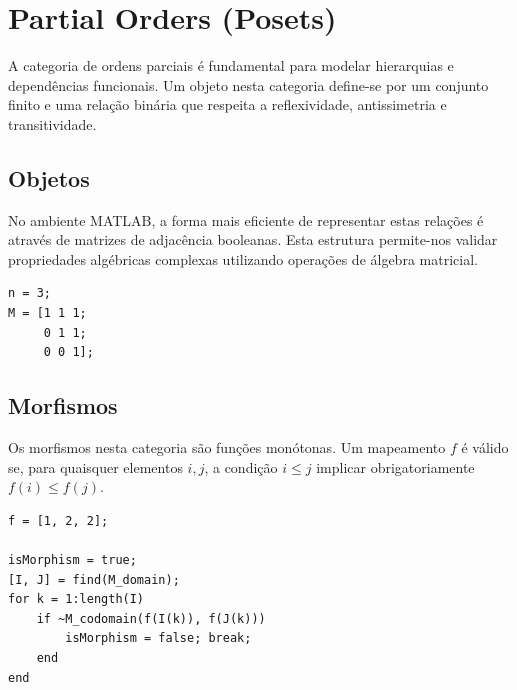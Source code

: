 \section{Partial Orders (Posets)}

A categoria de ordens parciais é fundamental para modelar hierarquias e dependências funcionais. Um objeto nesta categoria define-se por um conjunto finito e uma relação binária que respeita a reflexividade, antissimetria e transitividade.

\subsection{Objetos}
No ambiente MATLAB, a forma mais eficiente de representar estas relações é através de matrizes de adjacência booleanas. Esta estrutura permite-nos validar propriedades algébricas complexas utilizando operações de álgebra matricial.

\begin{lstlisting}[caption={Representação de um Poset (1 <= 2 <= 3)}]
% Matriz de adjacência para uma ordem linear
n = 3;
M = [1 1 1; 
     0 1 1; 
     0 0 1]; 
\end{lstlisting}

\subsection{Morfismos}
Os morfismos nesta categoria são funções monótonas. Um mapeamento $f$ é válido se, para quaisquer elementos $i, j$, a condição $i \le j$ implicar obrigatoriamente $f(i) \le f(j)$.

\begin{lstlisting}[caption={Algoritmo de Verificação de Monotonia}]
% f é um vetor onde o índice é o domínio e o valor é a imagem
f = [1, 2, 2]; 

isMorphism = true;
[I, J] = find(M_domain); 
for k = 1:length(I)
    if ~M_codomain(f(I(k)), f(J(k)))
        isMorphism = false; break;
    end
end
\end{lstlisting}